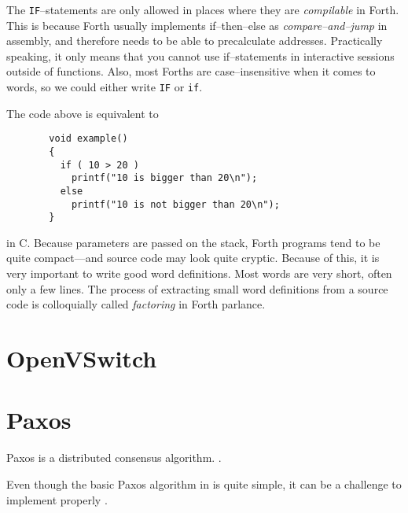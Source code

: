 The \texttt{IF}--statements are only allowed in places where they are
\textit{compilable} in Forth. This is because Forth usually implements
if--then--else as \textit{compare--and--jump} in assembly, and therefore
needs to be able to precalculate addresses.  Practically speaking, it only
means that you cannot use if--statements in interactive sessions outside of
functions.  Also, most Forths are case--insensitive when it comes to
words, so we could either write \texttt{IF} or \texttt{if}.

The code above is equivalent to

\begin{figure}[H]
  \centering
  \begin{Verbatim}
  void example()
  {
    if ( 10 > 20 )
      printf("10 is bigger than 20\n");
    else
      printf("10 is not bigger than 20\n");
  }
  \end{Verbatim}
\end{figure}

in C.  Because parameters are passed on the stack, Forth programs tend to be
quite compact---and source code may look quite cryptic.  Because of this, it
is very important to write good word definitions.  Most words are very
short, often only a few lines.  The process of extracting small word
definitions from a source code is colloquially called \textit{factoring} in
Forth parlance.

\section{OpenVSwitch}
\label{chapter:background.openvswitch}

\section{Paxos}
\label{chapter:background.paxos}

Paxos is a distributed consensus algorithm.
.

Even though the basic Paxos algorithm in \cite{Lam01} is quite simple, it can be
a challenge to implement properly \cite{Chandra:2007:PML:1281100.1281103}.
